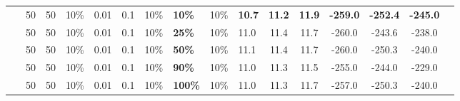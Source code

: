 \begin{sidewaystable}
\begin{tabular}{|l|l|l|l|l|l|l|l|l|l||c|c|c|c|c|c|}
    ~ & 50 & 50 & 10\% & 0.01 & 0.1 & 10\% & \textbf{10\%} & 10\% & \textbf{10.7} & \textbf{11.2} & \textbf{11.9} & \textbf{-259.0} & \textbf{-252.4} & \textbf{-245.0} \\
    ~ & 50 & 50 & 10\% & 0.01 & 0.1 & 10\% & \textbf{25\%} & 10\% & 11.0 & 11.4 & 11.7 & -260.0 & -243.6 & -238.0 \\
    ~ & 50 & 50 & 10\% & 0.01 & 0.1 & 10\% & \textbf{50\%} & 10\% & 11.1 & 11.4 & 11.7 & -260.0 & -250.3 & -240.0 \\
    ~ & 50 & 50 & 10\% & 0.01 & 0.1 & 10\% & \textbf{90\%} & 10\% & 11.0 & 11.3 & 11.5 & -255.0 & -244.0 & -229.0 \\
    ~ & 50 & 50 & 10\% & 0.01 & 0.1 & 10\% & \textbf{100\%} & 10\% & 11.0 & 11.3 & 11.7 & -257.0 & -250.3 & -240.0 \\


\end{tabular}
\end{sidewaystable}
